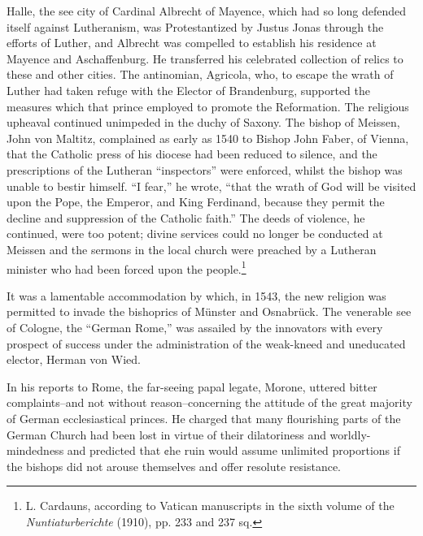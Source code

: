 Halle, the see city of Cardinal Albrecht of Mayence, which had so
long defended itself against Lutheranism, was Protestantized by Justus
Jonas through the efforts of Luther, and Albrecht was compelled to
establish his residence at Mayence and Aschaffenburg. He transferred
his celebrated collection of relics to these and other cities. The antinomian,
Agricola, who, to escape the wrath of Luther had taken refuge
with the Elector of Brandenburg, supported the measures which
that prince employed to promote the Reformation. The religious upheaval
continued unimpeded in the duchy of Saxony. The bishop
of Meissen, John von Maltitz, complained as early as 1540 to Bishop
John Faber, of Vienna, that the Catholic press of his diocese had been
reduced to silence, and the prescriptions of the Lutheran “inspectors”
were enforced, whilst the bishop was unable to bestir himself. “I fear,”
he wrote, “that the wrath of God will be visited upon the Pope, the
Emperor, and King Ferdinand, because they permit the decline and
suppression of the Catholic faith.” The deeds of violence, he continued,
were too potent; divine services could no longer be conducted
at Meissen and the sermons in the local church were preached by a
Lutheran minister who had been forced upon the people.\footnote
{L. Cardauns, according to Vatican manuscripts in the sixth volume of the \textit{Nuntiaturberichte}
(1910), pp. 233 and 237 sq.}

It was a lamentable accommodation by which, in 1543, the new
religion was permitted to invade the bishoprics of Münster and Osnabrück.
The venerable see of Cologne, the “German Rome,” was assailed
by the innovators with every prospect of success under the administration
of the weak-kneed and uneducated elector, Herman von
Wied.

In his reports to Rome, the far-seeing papal legate, Morone, uttered
bitter complaints--and not without reason--concerning the attitude
of the great majority of German ecclesiastical princes. He charged
that many flourishing parts of the German Church had been lost in
virtue of their dilatoriness and worldly-mindedness and predicted that
¢he ruin would assume unlimited proportions if the bishops did not
arouse themselves and offer resolute resistance.

